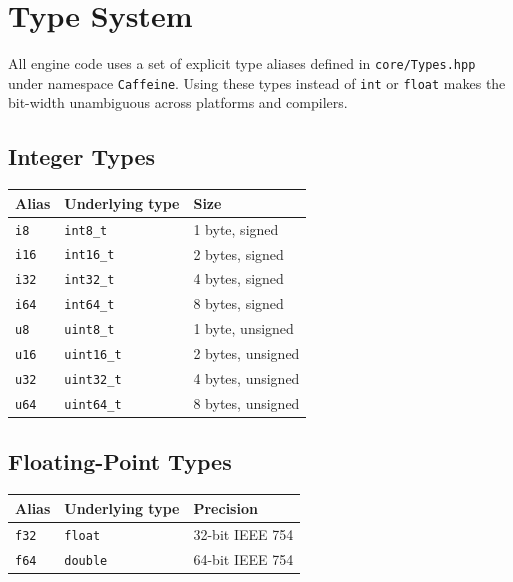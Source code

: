 \chapter{Type System}

All engine code uses a set of explicit type aliases defined in
\texttt{core/Types.hpp} under namespace \texttt{Caffeine}. Using these types
instead of \texttt{int} or \texttt{float} makes the bit-width unambiguous
across platforms and compilers.

\section{Integer Types}

\begin{longtable}{lll}
\toprule
\textbf{Alias} & \textbf{Underlying type} & \textbf{Size} \\
\midrule
\texttt{i8}  & \texttt{int8\_t}   & 1 byte, signed \\
\texttt{i16} & \texttt{int16\_t}  & 2 bytes, signed \\
\texttt{i32} & \texttt{int32\_t}  & 4 bytes, signed \\
\texttt{i64} & \texttt{int64\_t}  & 8 bytes, signed \\
\texttt{u8}  & \texttt{uint8\_t}  & 1 byte, unsigned \\
\texttt{u16} & \texttt{uint16\_t} & 2 bytes, unsigned \\
\texttt{u32} & \texttt{uint32\_t} & 4 bytes, unsigned \\
\texttt{u64} & \texttt{uint64\_t} & 8 bytes, unsigned \\
\bottomrule
\end{longtable}

\section{Floating-Point Types}

\begin{longtable}{lll}
\toprule
\textbf{Alias} & \textbf{Underlying type} & \textbf{Precision} \\
\midrule
\texttt{f32} & \texttt{float}  & 32-bit IEEE 754 \\
\texttt{f64} & \texttt{double} & 64-bit IEEE 754 \\
\bottomrule
\end{longtable}

